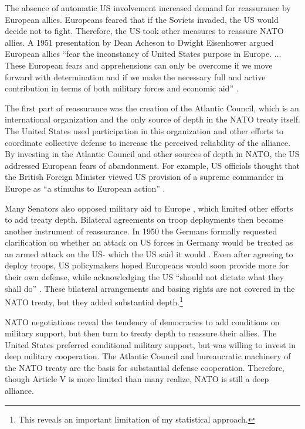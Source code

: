 \documentclass[12pt]{article}
\begin{document}
The absence of automatic US involvement increased demand for reassurance by European allies. 
Europeans feared that if the Soviets invaded, the US would decide not to fight. 
Therefore, the US took other measures to reassure NATO allies. 
A 1951 presentation by Dean Acheson to Dwight Eisenhower argued European allies ``fear the inconstancy of United States purpose in Europe. ... These European fears and apprehensions can only be overcome if we move forward with determination and if we make the necessary full and active contribution in terms of both military forces and economic aid'' \citep[pg. 3]{Acheson1951}. 


The first part of reassurance was the creation of the Atlantic Council, which is an international organization and the only source of depth in the NATO treaty itself. 
The United States used participation in this organization and other efforts to coordinate collective defense to increase the perceived reliability of the alliance. 
By investing in the Atlantic Council and other sources of depth in NATO, the US addressed European fears of abandonment. 
For example, US officials thought that the British Foreign Minister viewed US provision of a supreme commander in Europe as ``a stimulus to European action'' \citep{Acheson1950}. 


Many Senators also opposed military aid to Europe \citep[pg 285]{Acheson1969}, which limited other efforts to add treaty depth. 
Bilateral agreements on troop deployments then became another instrument of reassurance. 
In 1950 the Germans formally requested clarification on whether an attack on US forces in Germany would be treated as an armed attack on the US- which the US said it would \citep[pg. 395]{Acheson1969}.  
Even after agreeing to deploy troops, US policymakers hoped Europeans would soon provide more for their own defense, while acknowledging the US ``should not dictate what they shall do'' \citep[pg. 2]{Johnson1950}. 
These bilateral arrangements and basing rights are not covered in the NATO treaty, but they added substantial depth.\footnote{This reveals an important limitation of my statistical approach.}  


NATO negotiations reveal the tendency of democracies to add conditions on military support, but then turn to treaty depth to reassure their allies. 
The United States preferred conditional military support, but was willing to invest in deep military cooperation. 
The Atlantic Council and bureaucratic machinery of the NATO treaty are the basis for substantial defense cooperation. 
Therefore, though Article V is more limited than many realize, NATO is still a deep alliance. 
\end{document}
